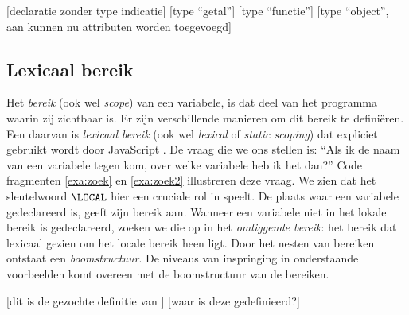 \begin{NoBreak}
\codeFragmentCaption
\begin{codelines}
  [declaratie zonder type indicatie]
  [type “getal”]
  [type “functie”]
  [type “object”, aan  kunnen nu attributen worden toegevoegd]
\end{codelines}
\end{NoBreak}

\subsection{Lexicaal bereik}

Het \emph{bereik} (ook wel \emph{scope}) van een variabele, is dat deel van het programma waarin zij zichtbaar is. Er zijn verschillende manieren om dit bereik te definiëren. Een daarvan is \emph{lexicaal bereik} (ook wel \emph{lexical} of \emph{static scoping}) dat expliciet gebruikt wordt door JavaScript \citep{javascript}.
De vraag die we ons stellen is: “Als ik de naam van een variabele tegen kom, over welke variabele heb ik het dan?” Code fragmenten \ref{exa:zoek} en \ref{exa:zoek2} illustreren deze vraag. We zien dat het sleutelwoord $\LOCAL$ hier een cruciale rol in speelt. De plaats waar een variabele gedeclareerd is, geeft zijn bereik aan. Wanneer een variabele niet in het lokale bereik is gedeclareerd, zoeken we die op in het \emph{omliggende bereik}: het bereik dat lexicaal gezien om het locale bereik heen ligt.
Door het nesten van bereiken ontstaat een \emph{boomstructuur}. De niveaus van inspringing in onderstaande voorbeelden komt overeen met de boomstructuur van de bereiken.%

\begin{NoBreak}
\codeFragmentCaption
\begin{codelines}
  [dit is de gezochte definitie van ]
  \codeLine{}
  [waar is deze  gedefinieerd?]
\end{codelines}
\end{NoBreak}

